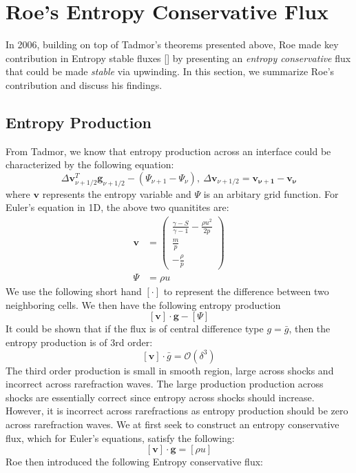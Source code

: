 \documentclass[a4paper]{article}
\numberwithin{equation}{section}
\begin{document}
\section{Roe's Entropy Conservative Flux}
In 2006, building on top of Tadmor's theorems presented above, Roe made key contribution in Entropy stable fluxes [] by presenting an \textit{entropy conservative} flux that could be made \textit{stable} via upwinding. In this section, we summarize Roe's contribution and discuss his findings.

\subsection{Entropy Production}
From Tadmor, we know that entropy production across an interface could be characterized by the following equation:
\begin{equation}
    \Delta \mathbf{v}_{\nu + 1/2}^T \mathbf{g}_{\nu + 1/2} - (\Psi_{\nu + 1} - \Psi_\nu), \ \Delta \mathbf{v}_{\nu + 1/2} = \mathbf{v_{\nu + 1}} - \mathbf{v}_\mathbf{\nu}
\end{equation}
where $\mathbf{v}$ represents the entropy variable and $\Psi$ is an arbitary grid function. For Euler's equation in 1D, the above two quanitites are:
\begin{equation}
    \begin{split}
        \mathbf{v} &= 
        \begin{pmatrix}
            \frac{\gamma - S}{\gamma - 1}-\frac{\rho u^2}{2p} \\
            \frac{m}{p}\\
            -\frac{\rho}{p}
        \end{pmatrix}\\
        \Psi &= \rho u
    \end{split}
\end{equation} 
We use the following short hand $\left[\cdot \right]$ to represent the difference between two neighboring cells. We then have the following entropy production
\begin{equation}
    \left[\mathbf{v}\right] \cdot \mathbf{g} - \left[\Psi\right]
\end{equation}
It could be shown that if the flux is of central difference type $g = \bar{g}$, then the entropy production is of 3rd order:
\begin{equation}
    \left[\mathbf{v}\right] \cdot \bar{g} = \mathcal{O}(\delta^3)
\end{equation}
The third order production is small in smooth region, large across shocks and incorrect across rarefraction waves. The large production production across shocks are essentially correct since entropy across shocks should increase. However, it is incorrect across rarefractions as entropy production should be zero across rarefraction waves. We at first seek to construct an entropy conservative flux, which for Euler's equations, satisfy the following:
\begin{equation}
    \left[\mathbf{v}\right] \cdot \mathbf{g} = \left[\rho u\right]
\end{equation}
Roe then introduced the following Entropy conservative flux:
\end{document}
